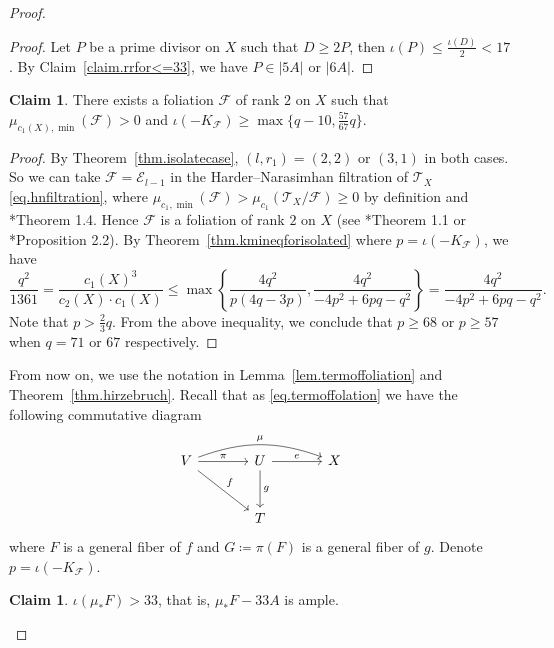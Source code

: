\documentclass[12pt,twoside]{amsart}
\theoremstyle{definition}
\newtheorem{claim}[thm]{Claim}
\begin{document}
\begin{proof}
    \begin{proof}
        Let $P$ be a prime divisor on $X$ such that $D\geq 2P$, then $\iota(P) \leq \frac{\iota(D)}{2}<17$. By Claim~\ref{claim.rrfor<=33}, we have $P\in |5A|$ or $|6A|$. 
    \end{proof}

    \begin{claim}\label{claim.prepare}
        There exists a foliation $\mathcal F$ of rank $2$ on $X$ such that $\mu_{c_1(X), \min}(\mathcal F)>0$ and $\iota(-K_{\mathcal F})\geq \max\{ q-10, \frac{57}{67}q\}$. 
    \end{claim}

    \begin{proof}
        By Theorem~\ref{thm.isolatecase}, $(l, r_1)=(2,2)$ or $(3,1)$ in both cases. So we can take $\mathcal F=\mathcal E_{l-1}$ in the Harder--Narasimhan filtration of $\mathcal{T}_X$ \eqref{eq.hnfiltration}, where $\mu_{c_1, \min}(\mathcal F)>\mu_{c_1}(\mathcal T_X/\mathcal F)\geq 0$ by definition and \cite{ouwenhao}*{Theorem 1.4}. Hence $\mathcal F$ is a foliation of rank $2$ on $X$ (see \cite{cp}*{Theorem 1.1} or \cite{ouwenhao}*{Proposition 2.2}). By Theorem~\ref{thm.kmineqforisolated} where $p=\iota(-K_\mathcal{F})$, we have 
        \[
            \frac{q^2}{1361}=\frac{c_1(X)^3}{c_2(X)\cdot c_1(X)}\leq \max\left\{\frac{4q^2}{p(4q-3p)} , \frac{4q^2}{-4p^2+6pq-q^2}\right\}=\frac{4q^2}{-4p^2+6pq-q^2}.
        \]
        Note that $p>\frac{2}{3}q$. From the above inequality, we conclude that $p\geq 68$ or $p\geq 57$ when $q=71$ or $67$ respectively.
    \end{proof}

    From now on, we use the notation in Lemma~\ref{lem.termoffoliation} and Theorem~\ref{thm.hirzebruch}. Recall that as  \eqref{eq.termoffolation} we have the following commutative diagram
    \[
        \begin{tikzcd}[row sep=large, column sep=large]
		V \arrow[rr,"\mu", bend left=20]\arrow[r,"\pi"] \arrow[dr,"f"] & U \arrow[r,"e"] \arrow[d,"g"] & X \\
		  & T
	\end{tikzcd}
    \]
    where $F$ is a general fiber of $f$ and $G\coloneq \pi(F)$ is a general fiber of $g$. Denote $p=\iota(-K_\mathcal{F})$. 

    \begin{claim}\label{claim.mu(F)}
        $\iota(\mu_*F)>33$, that is, $\mu_*F-33A$ is ample. 
    \end{claim}


\end{proof}
\end{document}
